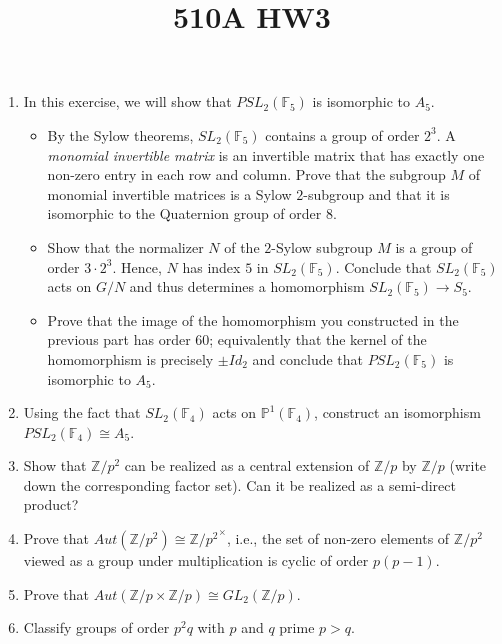 \documentclass[11pt,leqno]{article}
\newcommand{\Z}{{\mathbb Z}}
\newcommand{\<}[1]{{\langle}#1 {\rangle}}
\theoremstyle{plain}
\theoremstyle{definition}
\theoremstyle{remark}
\numberwithin{equation}{section}
\begin{document}
\pagestyle{fancy}
\renewcommand{\sectionmark}[1]{\markright{\thesection\ #1}}
\fancyhead{}
\fancyhead[LO,R]{\bfseries\footnotesize\thepage}
\fancyhead[LE]{\bfseries\footnotesize\rightmark}
\fancyhead[RO]{\bfseries\footnotesize\rightmark}
\chead[]{}
\cfoot[]{}
\setlength{\headheight}{1cm}

\author{}
\title{{\bf 510A HW3}}
\date{}
\maketitle
\begin{enumerate}
\item In this exercise, we will show that $PSL_2({\mathbb F}_5)$ is isomorphic to $A_5$.
\begin{itemize}
\item By the Sylow theorems, $SL_2({\mathbb F}_5)$ contains a group of order $2^3$.  A {\em monomial invertible matrix} is an invertible matrix that has exactly one non-zero entry in each row and column.  Prove that the subgroup $M$ of monomial invertible matrices is a Sylow $2$-subgroup and that it is isomorphic to the Quaternion group of order $8$.
\item Show that the normalizer $N$ of the $2$-Sylow subgroup $M$ is a group of order $3 \cdot 2^3$.  Hence, $N$ has index $5$ in $SL_2({\mathbb F}_5)$.  Conclude that $SL_2({\mathbb F}_5)$ acts on $G/N$ and thus determines a homomorphism $SL_2({\mathbb F}_5) \to S_5$.
\item Prove that the image of the homomorphism you constructed in the previous part has order $60$; equivalently that the kernel of the homomorphism is precisely $\pm Id_2$ and conclude that $PSL_2({\mathbb F}_5)$ is isomorphic to $A_5$.
\end{itemize}
\item Using the fact that $SL_2({\mathbb F}_4)$ acts on ${\mathbb P}^1({\mathbb F}_4)$, construct an isomorphism $PSL_2({\mathbb F}_4) \cong A_5$.
\item Show that $\Z/p^2$ can be realized as a central extension of $\Z/p$ by $\Z/p$ (write down the corresponding factor set).  Can it be realized as a semi-direct product?
\item Prove that $Aut(\Z/p^2) \cong {\Z/p^2}^{\times}$, i.e., the set of non-zero elements of $\Z/p^2$ viewed as a group under multiplication is cyclic of order $p(p-1)$.
\item Prove that $Aut(\Z/p \times \Z/p) \cong GL_2(\Z/p)$.
\item Classify groups of order $p^2 q$ with $p$ and $q$ prime $p > q$.

\end{enumerate}
\end{document}
